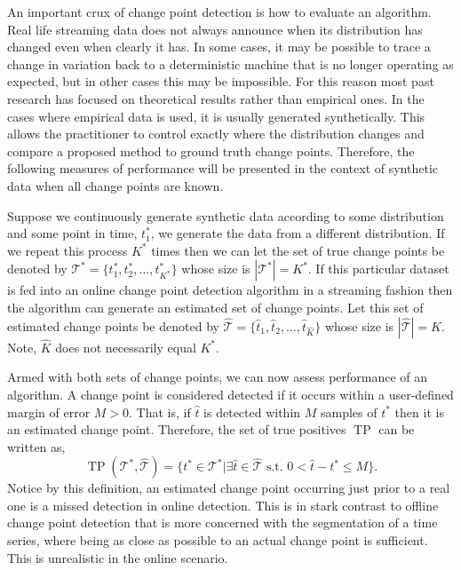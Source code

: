 An important crux of change point detection is how to evaluate an algorithm. Real life streaming data does not always announce when its distribution has changed even when clearly it has. In some cases, it may be possible to trace a change in variation back to a deterministic machine that is no longer operating as expected, but in other cases this may be impossible. For this reason most past research has focused on theoretical results rather than empirical ones. In the cases where empirical data is used, it is usually generated synthetically. This allows the practitioner to control exactly where the distribution changes and compare a proposed method to ground truth change points. Therefore, the following measures of performance will be presented in the context of synthetic data when all change points are known.

Suppose we continuously generate synthetic data according to some distribution and some point in time, $t_1^*$, we generate the data from a different distribution. If we repeat this process $K^*$ times then we can let the set of true change points be denoted by $\mathcal{T}^*=\{t_1^*, t_2^*,...,t_{K^*}^*\}$ whose size is $|\mathcal{T}^*| = K^*$. If this particular dataset is fed into an online change point detection algorithm in a streaming fashion then the algorithm can generate an estimated set of change points. Let this set of estimated change points be denoted by $\hat{\mathcal{T}}=\{\hat{t}_1, \hat{t}_2,...,\hat{t}_{\hat{K}}\}$ whose size is $|\hat{\mathcal{T}}| = \hat{K}$. Note, $\hat{K}$ does not necessarily equal $K^*$.

Armed with both sets of change points, we can now assess performance of an algorithm. A change point is considered detected if it occurs within a user-defined margin of error $M>0$. That is, if $\hat{t}$ is detected within $M$ samples of $t^*$ then it is an estimated change point. Therefore, the set of true positives $\operatorname{TP}$ can be written as,
\begin{equation}
\operatorname{TP}(\mathcal{T}^*, \hat{\mathcal{T}}) = \{t^* \in \mathcal{T}^* | \exists \hat{t} \in  \hat{\mathcal{T}} \text{ s.t. } 0 < \hat{t} - t^* \leq M\}.
\end{equation}
Notice by this definition, an estimated change point occurring just prior to a real one is a missed detection in online detection. This is in stark contrast to offline change point detection that is more concerned with the segmentation of a time series, where being as close as possible to an actual change point is sufficient. This is unrealistic in the online scenario.

